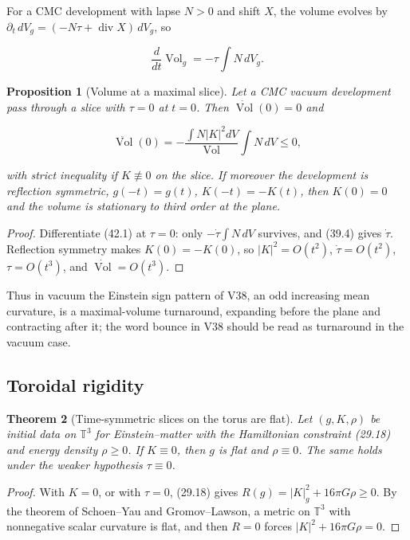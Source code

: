 \documentclass[11pt]{article}
\newtheorem{theorem}{Theorem}[section]
\newtheorem{proposition}[theorem]{Proposition}
\theoremstyle{remark}
\begin{document}
For a CMC development with lapse \(N>0\) and shift \(X\), the volume
evolves by \(\partial_t\,dV_g=(-N\tau+\operatorname{div}X)\,dV_g\), so

\[
 \frac{d}{dt}\operatorname{Vol}_g=-\tau\int N\,dV_g.                 \tag{42.1}
\]

\begin{proposition}[Volume at a maximal slice]
\label{prop:v19v39-maximal}
Let a CMC vacuum development pass through a slice with \(\tau=0\) at
\(t=0\).  Then \(\dot{\operatorname{Vol}}(0)=0\) and

\[
 \ddot{\operatorname{Vol}}(0)
 =-\frac{\int N|K|^2dV}{\operatorname{Vol}}\int N\,dV\leq0,           \tag{42.2}
\]

with strict inequality if \(K\not\equiv0\) on the slice.  If moreover
the development is reflection symmetric, \(g(-t)=g(t)\),
\(K(-t)=-K(t)\), then \(K(0)=0\) and the volume is stationary to third
order at the plane.
\end{proposition}

\begin{proof}
Differentiate (42.1) at \(\tau=0\): only \(-\dot\tau\int N\,dV\)
survives, and (39.4) gives \(\dot\tau\).  Reflection symmetry makes
\(K(0)=-K(0)\), so \(|K|^2=O(t^2)\), \(\dot\tau=O(t^2)\),
\(\tau=O(t^3)\), and \(\dot{\operatorname{Vol}}=O(t^3)\).
\end{proof}

Thus in vacuum the Einstein sign pattern of V38, an odd increasing
mean curvature, is a maximal-volume turnaround, expanding before the
plane and contracting after it; the word bounce in V38 should be read as
turnaround in the vacuum case.

\subsection{Toroidal rigidity}

\begin{theorem}[Time-symmetric slices on the torus are flat]
\label{thm:v19v39-rigidity}
Let \((g,K,\rho)\) be initial data on \(\mathbb T^3\) for Einstein--matter
with the Hamiltonian constraint (29.18) and energy density
\(\rho\geq0\).  If \(K\equiv0\), then \(g\) is flat and \(\rho\equiv0\).
The same holds under the weaker hypothesis \(\tau\equiv0\).
\end{theorem}

\begin{proof}
With \(K=0\), or with \(\tau=0\), (29.18) gives
\(R(g)=|K|_g^2+16\pi G\rho\geq0\).  By the theorem of Schoen--Yau and
Gromov--Lawson, a metric on \(\mathbb T^3\) with nonnegative scalar
curvature is flat, and then \(R=0\) forces \(|K|^2+16\pi G\rho=0\).
\end{proof}
\end{document}
